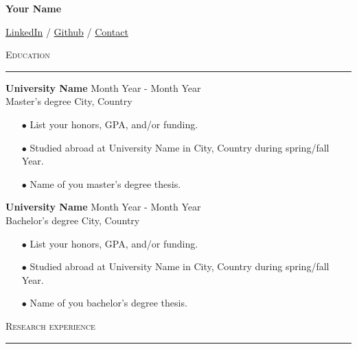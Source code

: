 \documentclass[letterpaper, 11pt]{article}
\begin{document}
\begin{center}
    \begin{Huge}
        \textbf{Your Name}
    \end{Huge}

    \begin{large}
        \href{https://www.linkedin.com}{LinkedIn} / \href{https://github.com}{Github} / \href{mailto:your@mail.com}{Contact}
    \end{large}
\end{center}

\vspace{1.00 ex}

\textsc{Education}
\vspace{1.00 ex}
\hrule


\textbf{University Name} \hfill Month Year - Month Year\\
Master's degree \hfill City, Country
\begin{itemize}[leftmargin = *, noitemsep, topsep = 1 pt]
    \item[$\bullet$] List your honors, GPA, and/or funding.
    \item[$\bullet$] Studied abroad at University Name in City, Country during spring/fall Year.
    \item[$\bullet$] Name of you master's degree thesis.
\end{itemize}

\vspace{1.00 ex}

\textbf{University Name} \hfill Month Year - Month Year\\
Bachelor's degree \hfill City, Country 
\begin{itemize}[leftmargin = *, noitemsep, topsep = 1 pt]
    \item[$\bullet$] List your honors, GPA, and/or funding.
    \item[$\bullet$] Studied abroad at University Name in City, Country during spring/fall Year.
    \item[$\bullet$] Name of you bachelor's degree thesis.
\end{itemize}

\vspace{1.00 mm}

\textsc{Research experience}
\vspace{1.00 ex}
\hrule
\end{document}
